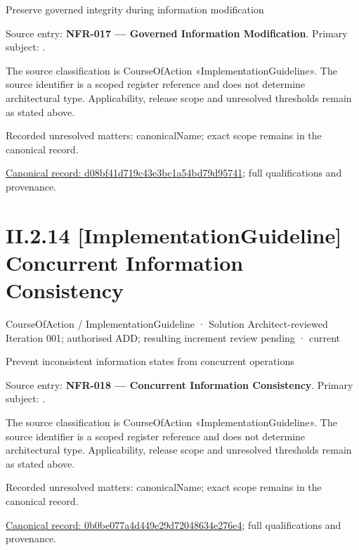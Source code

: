 Preserve governed integrity during information modification



Source entry: \textbf{NFR-017 — Governed Information Modification}. Primary subject: \texttt{}.



The source classification is CourseOfAction «ImplementationGuideline». The source identifier is a scoped register reference and does not determine architectural type. Applicability, release scope and unresolved thresholds remain as stated above.


{\small Recorded unresolved matters: canonicalName; exact scope remains in the canonical record.}\par
{\footnotesize \href{../../../../../../../continuum/strategy/course-of-action/implementation-guideline/d08bf41d719c43e3bc1a54bd79d95741.md}{Canonical record: d08bf41d719c43e3bc1a54bd79d95741}; full qualifications and provenance.}\par
\section*{II.2.14 [ImplementationGuideline] Concurrent Information Consistency}
\label{navigation:II.2.14}

\label{element:0b0be077a4d449e29d72048634e276e4}
{\small CourseOfAction / ImplementationGuideline · Solution Architect-reviewed Iteration 001; authorised ADD; resulting increment review pending · current}\par

Prevent inconsistent information states from concurrent operations



Source entry: \textbf{NFR-018 — Concurrent Information Consistency}. Primary subject: \texttt{}.



The source classification is CourseOfAction «ImplementationGuideline». The source identifier is a scoped register reference and does not determine architectural type. Applicability, release scope and unresolved thresholds remain as stated above.


{\small Recorded unresolved matters: canonicalName; exact scope remains in the canonical record.}\par
{\footnotesize \href{../../../../../../../continuum/strategy/course-of-action/implementation-guideline/0b0be077a4d449e29d72048634e276e4.md}{Canonical record: 0b0be077a4d449e29d72048634e276e4}; full qualifications and provenance.}\par
